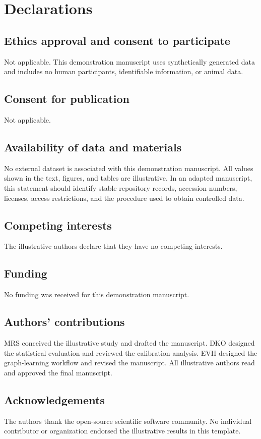 \section*{Declarations}

\subsection*{Ethics approval and consent to participate}
Not applicable. This demonstration manuscript uses synthetically generated data
and includes no human participants, identifiable information, or animal data.

\subsection*{Consent for publication}
Not applicable.

\subsection*{Availability of data and materials}
No external dataset is associated with this demonstration manuscript. All values
shown in the text, figures, and tables are illustrative. In an adapted manuscript,
this statement should identify stable repository records, accession numbers,
licenses, access restrictions, and the procedure used to obtain controlled data.

\subsection*{Competing interests}
The illustrative authors declare that they have no competing interests.

\subsection*{Funding}
No funding was received for this demonstration manuscript.

\subsection*{Authors' contributions}
MRS conceived the illustrative study and drafted the manuscript. DKO designed the
statistical evaluation and reviewed the calibration analysis. EVH designed the
graph-learning workflow and revised the manuscript. All illustrative authors read
and approved the final manuscript.

\subsection*{Acknowledgements}
The authors thank the open-source scientific software community. No individual
contributor or organization endorsed the illustrative results in this template.

